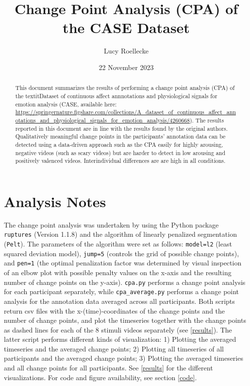 \documentclass[11pt, letterpaper]{article}
\title{Change Point Analysis (CPA) of the CASE Dataset}
\author{Lucy Roellecke}
\date{22 November 2023}
\begin{document}
\maketitle

\begin{abstract}
This document summarizes the results of performing a change point analysis (CPA) of the textit{Dataset of continuous affect annnotations and physiological signals for emotion analysis (CASE}, available here: \url{https://springernature.figshare.com/collections/A_dataset_of_continuous_affect_annotations_and_physiological_signals_for_emotion_analysis/4260668}). The results reported in this document are in line with the results found by the original authors. Qualitatively meaningful change points in the participants' annotation data can be detected using a data-driven approach such as the CPA easily for highly arousing, negative videos (such as scary videos) but are harder to detect in low arousing and positively valenced videos. Interindividual differences are are high in all conditions.
\end{abstract}

\newpage

\section{Analysis Notes}
The change point analysis was undertaken by using the Python package \verb|ruptures| (Version 1.1.8) and the algorithm of linearly penalized segmentation (\verb|Pelt|). The parameters of the algorithm were set as follows: \verb|model=l2| (least squared deviation model),  \verb|jump=5| (controls the grid of possible change points), and \verb|pen=1| (the optimal penalization factor was determined by visual inspection of an elbow plot with possible penalty values on the x-axis and the resulting number of change points on the y-axis). \verb|cpa.py| performs a change point analysis for each participant separately, while \verb|cpa_average.py| performs a change point analysis for the annotation data averaged across all participants. Both scripts return csv files with the x-(time)-coordinates of the change points and the number of change points, and plot the timeseries together with the change points as dashed lines for each of the 8 stimuli videos separately (see \ref{results}). The latter script performs different kinds of visualization: 1) Plotting the averaged timeseries and the averaged change points; 2) Plotting all timeseries of all participants and the averaged change points; 3) Plotting the averaged timeseries and all change points for all participants. See \ref{results} for the different visualizations. For code and figure availability, see section \ref{code}.
\end{document}

